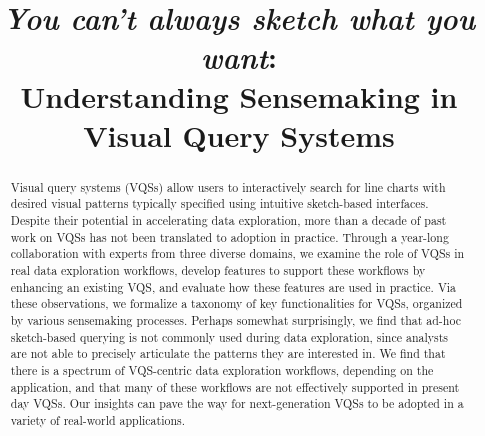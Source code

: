 \documentclass[sigchi]{acmart}
\begin{document}
\title{{\em You can't always sketch what you want}: \\ Understanding Sensemaking in Visual Query Systems}


\begin{abstract}
Visual query systems (VQSs) allow users 
to interactively search for line charts
with desired visual patterns typically specified using 
intuitive sketch-based interfaces. 
Despite their potential in accelerating
data exploration, 
more than a decade of past work 
on VQSs has not been translated to 
adoption in practice. 
Through a year-long collaboration with experts 
from three diverse domains, 
we examine the role of VQSs in real
data exploration workflows,  
develop features to support these workflows by enhancing
an existing VQS,
and evaluate how these features are used in practice.
Via these observations, we formalize 
a taxonomy of key functionalities
for VQSs, organized by various sensemaking processes. 
Perhaps somewhat surprisingly, we find
that ad-hoc sketch-based querying 
is not commonly used during data exploration, since 
analysts are not able to precisely 
articulate the patterns they are interested in.
We find that there is a spectrum of
VQS-centric data exploration workflows, 
depending on the application, 
and that many 
of these workflows are not 
effectively supported in
present day VQSs.
Our insights can pave the way for 
next-generation VQSs
to be adopted in a variety 
of real-world applications.






\end{abstract}
\end{document}
